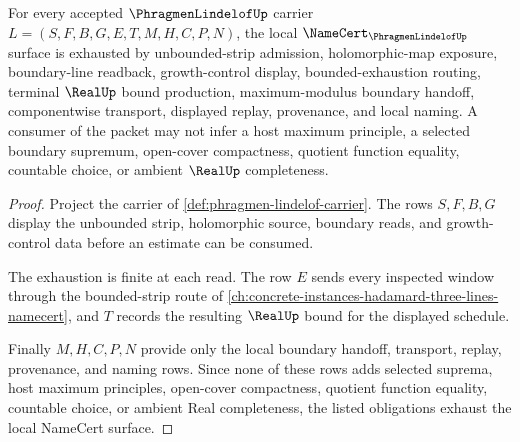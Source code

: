 \begin{theorem}
\label{thm:phragmen-lindelof-namecert-obligations}
For every accepted $\PhragmenLindelofUp$ carrier $L=(S,F,B,G,E,T,M,H,C,P,N)$, the local $\NameCert_{\PhragmenLindelofUp}$ surface is exhausted by unbounded-strip admission, holomorphic-map exposure, boundary-line readback, growth-control display, bounded-exhaustion routing, terminal $\RealUp$ bound production, maximum-modulus boundary handoff, componentwise transport, displayed replay, provenance, and local naming. A consumer of the packet may not infer a host maximum principle, a selected boundary supremum, open-cover compactness, quotient function equality, countable choice, or ambient $\RealUp$ completeness.
\end{theorem}
\begin{proof}
Project the carrier of \autoref{def:phragmen-lindelof-carrier}. The rows $S,F,B,G$ display the unbounded strip, holomorphic source, boundary reads, and growth-control data before an estimate can be consumed.

The exhaustion is finite at each read. The row $E$ sends every inspected window through the bounded-strip route of \autoref{ch:concrete-instances-hadamard-three-lines-namecert}, and $T$ records the resulting $\RealUp$ bound for the displayed schedule.

Finally $M,H,C,P,N$ provide only the local boundary handoff, transport, replay, provenance, and naming rows. Since none of these rows adds selected suprema, host maximum principles, open-cover compactness, quotient function equality, countable choice, or ambient Real completeness, the listed obligations exhaust the local NameCert surface.
\end{proof}

